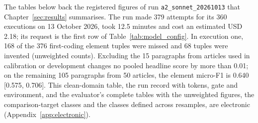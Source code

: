 The tables below back the registered figures of run \texttt{a2\_sonnet\_20261013} that Chapter~\ref{sec:results} summarises. The run made 379 attempts for its 360 executions on 13 October 2026, took 12.5 minutes and cost an estimated USD 2.18; its request is the first row of Table~\ref{tab:model_config}. In execution one, 168 of the 376 first-coding element tuples were missed and 68 tuples were invented (unweighted counts). Excluding the 15 paragraphs from articles used in calibration or development changes no pooled headline score by more than 0.01; on the remaining 105 paragraphs from 50 articles, the element micro-F1 is 0.640 [0.575, 0.706]. This clean-domain table, the run record with tokens, gate and environment, and the evaluator's complete tables with the unweighted figures, the comparison-target classes and the classes defined across resamples, are electronic (Appendix~\ref{app:electronic}).



\begingroup\let\footnotesize\scriptsize\endgroup



